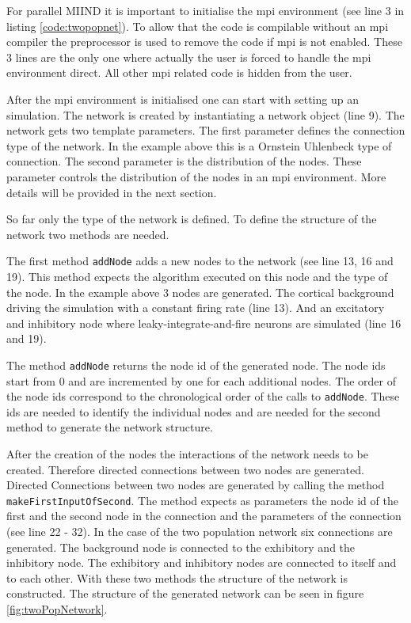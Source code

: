 \documentclass[12pt]{article}
\begin{document}
For parallel MIIND it is important to initialise the mpi environment (see line 3 in listing \ref{code:twopopnet}).
To allow that the code is compilable without an mpi compiler the preprocessor is used to remove the code if mpi is not enabled.
These 3 lines are the only one where actually the user is forced to handle the mpi environment direct.
All other mpi related code is hidden from the user.

After the mpi environment is initialised one can start with setting up an simulation.
The network is created by instantiating a network object (line 9).
The network gets two template parameters.
The first parameter defines the connection type of the network.
In the example above this is a Ornstein Uhlenbeck type of connection.
The second parameter is the distribution of the nodes.
These parameter controls the distribution of the nodes in an mpi environment.
More details will be provided in the next section.

So far only the type of the network is defined.
To define the structure of the network two methods are needed.


The first method \texttt{addNode} adds a new nodes to the network (see line 13, 16 and 19).
This method expects the algorithm executed on this node and the type of the node.
In the example above 3 nodes are generated.
The cortical background driving the simulation with a constant firing rate (line 13).
And an excitatory and inhibitory node where leaky-integrate-and-fire neurons are simulated (line 16 and 19). %

The method \texttt{addNode} returns the node id of the generated node.
The node ids start from 0 and are incremented by one for each additional nodes.
The order of the node ids correspond to the chronological order of the calls to \texttt{addNode}.
These ids are needed to identify the individual nodes and are needed for the second method to generate the network structure.

After the creation of the nodes the interactions of the network needs to be created.
Therefore directed connections between two nodes are generated.
Directed Connections between two nodes are generated by calling the method \texttt{makeFirstInputOfSecond}.
The method expects as parameters the node id of the first and the second node in the connection and the parameters of the connection (see line 22 - 32).
In the case of the two population network six connections are generated.
The background node is connected to the exhibitory and the inhibitory node.
The exhibitory and inhibitory nodes are connected to itself and to each other.
With these two methods the structure of the network is constructed.
The structure of the generated network can be seen in figure \ref{fig:twoPopNetwork}.
\end{document}
